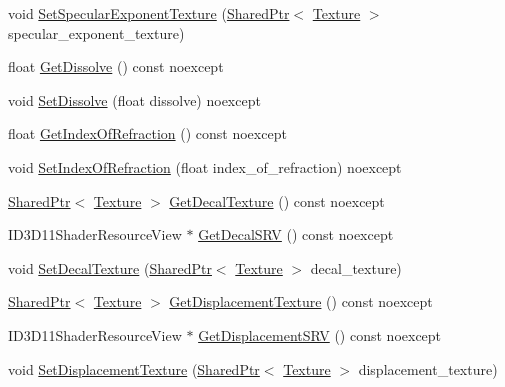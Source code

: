 \begin{DoxyCompactItemize}
\item 
void \hyperlink{structmage_1_1_material_ae07cb5f8c3b4ee0d6e6f4f91c1cbbf35}{Set\+Specular\+Exponent\+Texture} (\hyperlink{namespacemage_a1e01ae66713838a7a67d30e44c67703e}{Shared\+Ptr}$<$ \hyperlink{classmage_1_1_texture}{Texture} $>$ specular\+\_\+exponent\+\_\+texture)
\item 
float \hyperlink{structmage_1_1_material_aa320c6b371b9f055a76821db71d185bc}{Get\+Dissolve} () const noexcept
\item 
void \hyperlink{structmage_1_1_material_ad86de160f4e4e03c24329d8f9415ccaa}{Set\+Dissolve} (float dissolve) noexcept
\item 
float \hyperlink{structmage_1_1_material_afa719020dabd412bbb06ac9f0d85abe9}{Get\+Index\+Of\+Refraction} () const noexcept
\item 
void \hyperlink{structmage_1_1_material_ae0f95f54af97ecff043ec7728260ae2b}{Set\+Index\+Of\+Refraction} (float index\+\_\+of\+\_\+refraction) noexcept
\item 
\hyperlink{namespacemage_a1e01ae66713838a7a67d30e44c67703e}{Shared\+Ptr}$<$ \hyperlink{classmage_1_1_texture}{Texture} $>$ \hyperlink{structmage_1_1_material_a7cf62e3f72b74c945e3d5c47c2c73485}{Get\+Decal\+Texture} () const noexcept
\item 
I\+D3\+D11\+Shader\+Resource\+View $\ast$ \hyperlink{structmage_1_1_material_a8d189673acfe8d0c104873fe0cceb601}{Get\+Decal\+S\+RV} () const noexcept
\item 
void \hyperlink{structmage_1_1_material_ad52bf9c9d802fce7f7ec47f35a44d180}{Set\+Decal\+Texture} (\hyperlink{namespacemage_a1e01ae66713838a7a67d30e44c67703e}{Shared\+Ptr}$<$ \hyperlink{classmage_1_1_texture}{Texture} $>$ decal\+\_\+texture)
\item 
\hyperlink{namespacemage_a1e01ae66713838a7a67d30e44c67703e}{Shared\+Ptr}$<$ \hyperlink{classmage_1_1_texture}{Texture} $>$ \hyperlink{structmage_1_1_material_ab548fbf5844ae7cd2822304ef7fb9602}{Get\+Displacement\+Texture} () const noexcept
\item 
I\+D3\+D11\+Shader\+Resource\+View $\ast$ \hyperlink{structmage_1_1_material_a638ee0913aa0722f499c883b71549503}{Get\+Displacement\+S\+RV} () const noexcept
\item 
void \hyperlink{structmage_1_1_material_ab9c90afa999906a3ad33c8a8da13da24}{Set\+Displacement\+Texture} (\hyperlink{namespacemage_a1e01ae66713838a7a67d30e44c67703e}{Shared\+Ptr}$<$ \hyperlink{classmage_1_1_texture}{Texture} $>$ displacement\+\_\+texture)
\item 

\end{DoxyCompactItemize}
